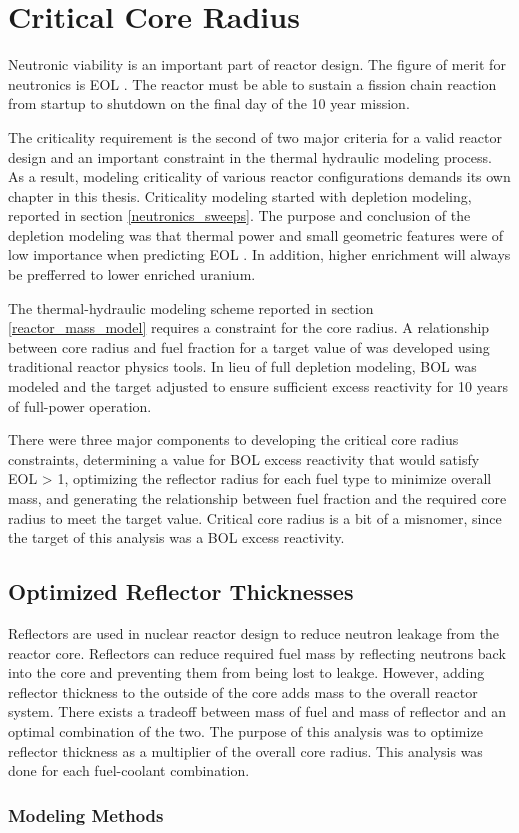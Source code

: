 \section{Critical Core Radius}

Neutronic viability is an important part of reactor design. The figure of merit
for neutronics is EOL \keff. The reactor must be able to sustain a fission
chain reaction from startup to shutdown on the final day of the 10 year mission.

The criticality requirement is the second of two major criteria for a valid reactor design and an
important constraint in the thermal hydraulic modeling process. As a result,
modeling criticality of various reactor configurations demands its own chapter
in this thesis. Criticality modeling started with depletion modeling, reported
in section \ref{neutronics_sweeps}. The purpose and conclusion of the depletion
modeling was that thermal power and small geometric features were of low
importance when predicting EOL \keff. In addition, higher enrichment will always
be prefferred to lower enriched uranium.

The thermal-hydraulic modeling scheme
reported in section \ref{reactor_mass_model} requires a constraint for the core
radius. A relationship between core radius and fuel fraction for a target
value of \keff was developed using traditional reactor physics tools. In lieu of
full depletion modeling, BOL \keff was modeled and the \keff target adjusted to
ensure sufficient excess reactivity for 10 years of full-power operation.

There were three major components to developing the critical core radius
constraints, determining a value for BOL excess reactivity that would satisfy
EOL \keff > 1, optimizing the reflector radius for each fuel type to minimize
overall mass, and generating the relationship between fuel fraction and the
required core radius to meet the target \keff value. Critical core radius is a
bit of a misnomer, since the target of this analysis was a BOL excess
reactivity.

\subsection{Optimized Reflector Thicknesses}
Reflectors are used in nuclear reactor design to reduce neutron leakage from the
reactor core. Reflectors can reduce required fuel mass by reflecting neutrons
back into the core and preventing them from being lost to leakge. However,
adding reflector thickness to the outside of the core adds mass to the overall
reactor system. There exists a tradeoff between mass of fuel and mass of
reflector and an optimal combination of the two. The purpose of this analysis
was to optimize reflector thickness as a multiplier of the overall core radius.
This analysis was done for each fuel-coolant combination.

\subsubsection{Modeling Methods}
